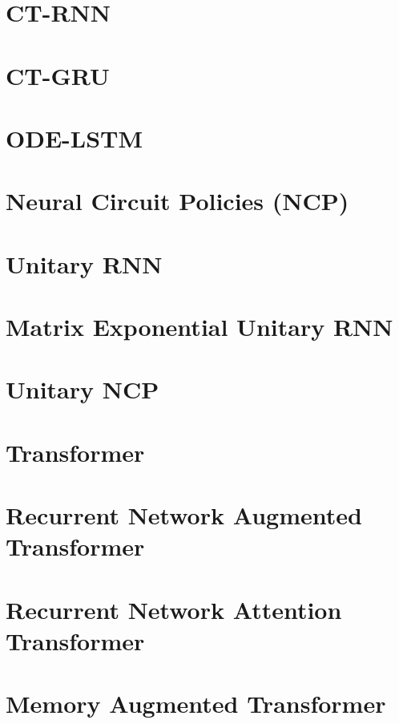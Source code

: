 \documentclass[draft,final]{vutinfth} %
\begin{document}
    \section{CT-RNN}

    \section{CT-GRU}

    \section{ODE-LSTM}

    \section{Neural Circuit Policies (NCP)}

    \section{Unitary RNN}

    \section{Matrix Exponential Unitary RNN}

    \section{Unitary NCP}

    \section{Transformer}

    \section{Recurrent Network Augmented Transformer}

    \section{Recurrent Network Attention Transformer}

    \section{Memory Augmented Transformer}
\end{document}
